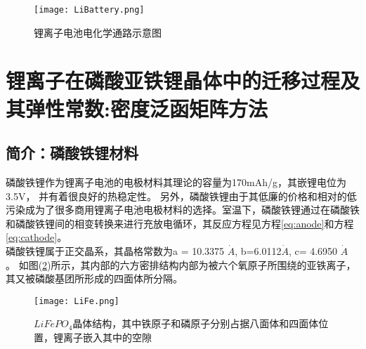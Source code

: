 \begin{figure}
\centering   
\texttt{[image: LiBattery.png]}
\caption{锂离子电池电化学通路示意图\cite{Tarascon2001Issues}} 
\label{fig:LiBattery}
\end{figure}
\section{锂离子在磷酸亚铁锂晶体中的迁移过程及其弹性常数:密度泛函矩阵方法}
\subsection{简介：磷酸铁锂材料}
磷酸铁锂作为锂离子电池的电极材料其理论的容量为170mAh/g，其嵌锂电位为3.5V， 并有着很良好的热稳定性。 另外，磷酸铁锂由于其低廉的价格和相对的低污染成为了很多商用锂离子电池电极材料的选择。室温下，磷酸铁锂通过在磷酸铁和磷酸铁锂间的相变转换来进行充放电循环，其反应方程见方程\ref{eq:anode}和方程\ref{eq:cathode}。\\
\indent 磷酸铁锂属于正交晶系，其晶格常数为a = 10.3375 $\dot{A}$, b=6.0112$\dot{A}$, c= 4.6950 $\dot{A}$ 。 如图(\ref{fig:LiFe})所示，其内部的六方密排结构内部为被六个氧原子所围绕的亚铁离子，其又被磷酸基团所形成的四面体所分隔。
\begin{figure}
\centering   
\texttt{[image: LiFe.png]}
\caption{$LiFePO_4$晶体结构，其中铁原子和磷原子分别占据八面体和四面体位置，锂离子嵌入其中的空隙\cite{Zhang2011Structure}} 
\label{fig:LiFe}
\end{figure}
